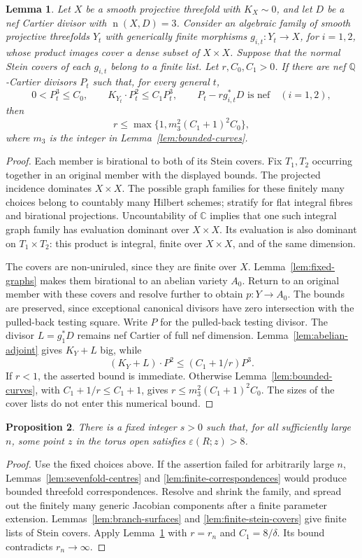 \documentclass[12pt,a4paper,psamsfonts]{amsart}
\theoremstyle{definition}
\theoremstyle{plain}
\newtheorem{lemma}{Lemma}[section]
\newtheorem{proposition}[lemma]{Proposition}
\newcommand{\C}{\mathbb C}
\newcommand{\nef}{\operatorname{n}}
\begin{document}
\begin{lemma}\label{lem:bounded-correspondence-exclusion}
Let $X$ be a smooth projective threefold with $K_X\sim0$, and let
$D$ be a nef Cartier divisor with $\nef(X,D)=3$.
Consider an algebraic family of smooth projective threefolds $Y_t$
with generically finite morphisms $g_{i,t}:Y_t\to X$, for $i=1,2$,
whose product images cover a dense subset of $X\times X$.
Suppose that the normal Stein covers of each $g_{i,t}$ belong to
a finite list. Let $r,C_0,C_1>0$. If there are nef $\mathbb{Q}$-Cartier
divisors $P_t$ such that, for every general $t$,
\[
 0<P_t^3\le C_0,\qquad K_{Y_t}\cdot P_t^2\le C_1P_t^3,\qquad
 P_t-rg_{i,t}^*D\text{ is nef}\quad(i=1,2),
\]
then
\[
 r\le\max\{1,m_3^2(C_1+1)^2C_0\},
\]
where $m_3$ is the integer in Lemma~\ref{lem:bounded-curves}.
\end{lemma}
\begin{proof}
Each member is birational to both of its Stein covers. Fix $T_1,T_2$
occurring together in an original member with the displayed bounds. The projected incidence
dominates $X\times X$. The possible graph families for these finitely many choices
belong to countably many Hilbert schemes;
stratify for flat integral fibres and birational projections.
Uncountability of $\C$ implies that one such integral graph
family has evaluation dominant over $X\times X$. Its evaluation
is also dominant on $T_1\times T_2$: this product is integral,
finite over $X\times X$, and of the same dimension.

The covers are non-uniruled, since they are finite over $X$.
Lemma~\ref{lem:fixed-graphs} makes them birational to an abelian
variety $A_0$. Return to an original member with these covers and resolve further
to obtain $p:Y\to A_0$. The bounds are preserved, since exceptional
canonical divisors have zero intersection with the pulled-back
testing square. Write $P$ for the pulled-back testing divisor.
The divisor $L=g_1^*D$ remains nef Cartier of
full nef dimension. Lemma~\ref{lem:abelian-adjoint} gives
$K_Y+L$ big, while
\[
 (K_Y+L)\cdot P^2\le(C_1+1/r)P^3.
\]
If $r<1$, the asserted bound is immediate. Otherwise
Lemma~\ref{lem:bounded-curves}, with $C_1+1/r\le C_1+1$, gives
$r\le m_3^2(C_1+1)^2C_0$. The sizes of the cover lists do not enter
this numerical bound.
\end{proof}


\begin{proposition}\label{prop:sevenfold-jets}
There is a fixed integer $s>0$ such that, for all sufficiently
large $n$, some point $z$ in the torus open satisfies
$\varepsilon(R;z)>8$.
\end{proposition}
\begin{proof}
Use the fixed choices above. If the assertion failed for arbitrarily
large $n$, Lemmas~\ref{lem:sevenfold-centres} and
\ref{lem:finite-correspondences} would produce bounded threefold
correspondences. Resolve and shrink the family, and spread out
the finitely many generic Jacobian components after a finite
parameter extension. Lemmas~\ref{lem:branch-surfaces} and
\ref{lem:finite-stein-covers} give finite lists of Stein covers.
Apply Lemma~\ref{lem:bounded-correspondence-exclusion} with
$r=r_n$ and $C_1=8/\delta$. Its bound contradicts $r_n\to\infty$.
\end{proof}
\end{document}
